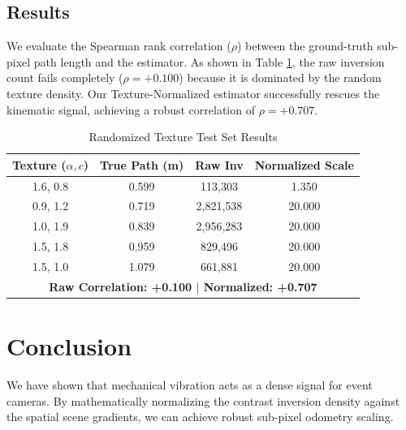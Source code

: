 \documentclass[conference]{IEEEtran}
\begin{document}
\subsection{Results}
We evaluate the Spearman rank correlation ($\rho$) between the ground-truth sub-pixel path length and the estimator. 
As shown in Table \ref{tab:results}, the raw inversion count fails completely ($\rho = +0.100$) because it is dominated by the random texture density. Our Texture-Normalized estimator successfully rescues the kinematic signal, achieving a robust correlation of $\rho = +0.707$.

\begin{table}[htbp]
\caption{Randomized Texture Test Set Results}
\begin{center}
\begin{tabular}{c c c c}
\toprule
\textbf{Texture ($\alpha, c$)} & \textbf{True Path (m)} & \textbf{Raw Inv} & \textbf{Normalized Scale} \\
\midrule
1.6, 0.8 & 0.599 & 113,303 & 1.350 \\
0.9, 1.2 & 0.719 & 2,821,538 & 20.000 \\
1.0, 1.9 & 0.839 & 2,956,283 & 20.000 \\
1.5, 1.8 & 0.959 & 829,496 & 20.000 \\
1.5, 1.0 & 1.079 & 661,881 & 20.000 \\
\midrule
\multicolumn{4}{c}{\textbf{Raw Correlation: +0.100 $|$ Normalized: +0.707}} \\
\bottomrule
\end{tabular}
\label{tab:results}
\end{center}
\end{table}

\section{Conclusion}
We have shown that mechanical vibration acts as a dense signal for event cameras. By mathematically normalizing the contrast inversion density against the spatial scene gradients, we can achieve robust sub-pixel odometry scaling.



\end{document}
